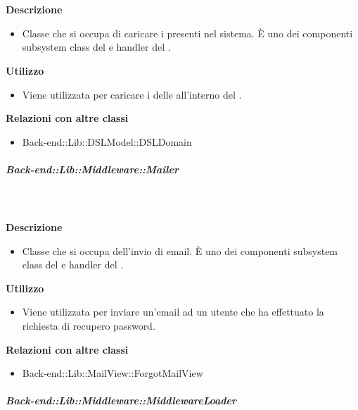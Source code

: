         \textbf{\\ \\ Descrizione} 
          \begin{itemize}
            \item[] Classe che si occupa di caricare i  presenti nel sistema. È uno dei componenti subsystem class del   e handler del  .
          \end{itemize}      
        \textbf{Utilizzo}  
          \begin{itemize}
            \item[] Viene utilizzata per caricare i  delle  all'interno del .
          \end{itemize}
          \textbf{Relazioni con altre classi}
          \begin{itemize}
              \item{Back-end::Lib::DSLModel::DSLDomain}
          \end{itemize}
      \subparagraph{Back-end::Lib::Middleware::Mailer}
        
        \textbf{\\ \\ Descrizione} 
          \begin{itemize}
            \item[] Classe che si occupa dell'invio di email. È uno dei componenti subsystem class del   e handler del  .
          \end{itemize}      
        \textbf{Utilizzo}  
          \begin{itemize}
            \item[] Viene utilizzata per inviare un'email ad un utente che ha effettuato la richiesta di recupero password.
          \end{itemize}
          \textbf{Relazioni con altre classi}
          \begin{itemize}
              \item{Back-end::Lib::MailView::ForgotMailView}
          \end{itemize}
      \subparagraph{Back-end::Lib::Middleware::MiddlewareLoader}
        
